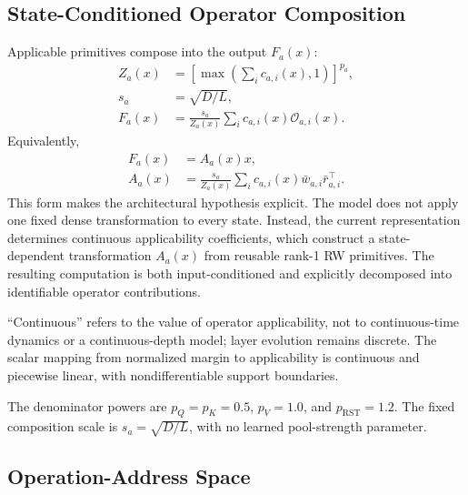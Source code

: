 \documentclass{article}
\newcommand{\op}{\mathcal{O}}
\begin{document}
\subsection{State-Conditioned Operator Composition}
\label{sec:operator-composition}

Applicable primitives compose into the output \(F_a(x)\):
\begin{align}
Z_a(x)&=\left[\max\!\left(\sum_i c_{a,i}(x),1\right)\right]^{p_a},\\
s_a&=\sqrt{D/L},\nonumber\\
F_a(x)&=\frac{s_a}{Z_a(x)}
\sum_i c_{a,i}(x)\op_{a,i}(x).
\label{eq:implemented_composition}
\end{align}
Equivalently,
\begin{equation}
\begin{aligned}
F_a(x)&=A_a(x)x,\\
A_a(x)&=\frac{s_a}{Z_a(x)}
\sum_i c_{a,i}(x)\bar w_{a,i}\bar r_{a,i}^{\top}.
\end{aligned}
\label{eq:state_dependent_operator}
\end{equation}
This form makes the architectural hypothesis explicit. The model does not apply
one fixed dense transformation to every state. Instead, the current
representation determines continuous applicability coefficients, which
construct a state-dependent transformation \(A_a(x)\) from reusable rank-1 RW
primitives. The resulting computation is both input-conditioned and explicitly
decomposed into identifiable operator contributions.

``Continuous'' refers to the value of operator applicability, not to
continuous-time dynamics or a continuous-depth model; layer evolution remains
discrete. The scalar mapping from normalized margin to applicability is
continuous and piecewise linear, with nondifferentiable support boundaries.

The denominator powers are \(p_Q=p_K=0.5\), \(p_V=1.0\), and
\(p_{\mathrm{RST}}=1.2\). The fixed composition scale is
\(s_a=\sqrt{D/L}\), with no
learned pool-strength parameter.

\subsection{Operation-Address Space}
\label{sec:operation-space}
\end{document}
